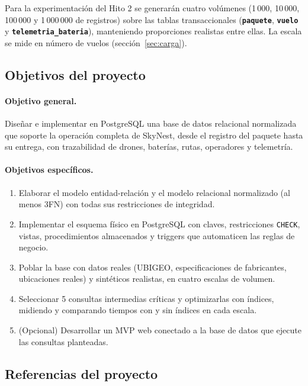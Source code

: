 \documentclass[11pt,a4paper]{article}
\newcommand{\tb}[1]{\textbf{\texttt{#1}}}
\begin{document}
Para la experimentación del Hito 2 se generarán cuatro volúmenes (1\,000, 10\,000, 100\,000 y 1\,000\,000 de registros) sobre las tablas transaccionales (\tb{paquete}, \tb{vuelo} y \tb{telemetria\_bateria}), manteniendo proporciones realistas entre ellas. La escala se mide en número de vuelos (sección~\ref{sec:carga}).

\subsection{Objetivos del proyecto}
\paragraph{Objetivo general.} Diseñar e implementar en PostgreSQL una base de datos relacional normalizada que soporte la operación completa de SkyNest, desde el registro del paquete hasta su entrega, con trazabilidad de drones, baterías, rutas, operadores y telemetría.

\paragraph{Objetivos específicos.}
\begin{enumerate}
\item Elaborar el modelo entidad-relación y el modelo relacional normalizado (al menos 3FN) con todas sus restricciones de integridad.
\item Implementar el esquema físico en PostgreSQL con claves, restricciones \texttt{CHECK}, vistas, procedimientos almacenados y triggers que automaticen las reglas de negocio.
\item Poblar la base con datos reales (UBIGEO, especificaciones de fabricantes, ubicaciones reales) y sintéticos realistas, en cuatro escalas de volumen.
\item Seleccionar 5 consultas intermedias críticas y optimizarlas con índices, midiendo y comparando tiempos con y sin índices en cada escala.
\item (Opcional) Desarrollar un MVP web conectado a la base de datos que ejecute las consultas planteadas.
\end{enumerate}

\subsection{Referencias del proyecto}
\end{document}
